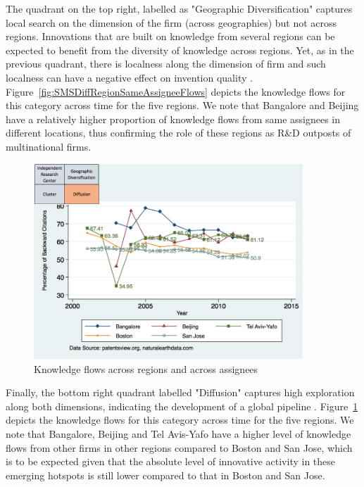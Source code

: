 \documentclass[parskip=full,12pt,letterpaper]{article}
\begin{document}
The quadrant on the top right, labelled as "Geographic Diversification" captures local search on the dimension of the firm (across geographies) but not across regions. Innovations that are built on knowledge from several regions can be expected to benefit from the diversity of knowledge across regions. Yet, as in the previous quadrant, there is localness along the dimension of firm and such localness can have a negative effect on invention quality \citep{Rosenkopf2001}. Figure~\ref{fig:SMSDiffRegionSameAssigneeFlows} depicts the  knowledge flows for this category across time for the five regions. We note that Bangalore and Beijing have a relatively higher proportion of knowledge flows from same assignees in different locations, thus confirming the role of these regions as R\&D outposts of multinational firms.\par

\begin{figure}[h!]
\begin{centering}
  \includegraphics[width=0.90\textwidth]{SMSDiffRegionDiffAssigneeFlows}
  \caption{Knowledge flows across regions and across assignees}
  \label{fig:SMSDiffRegionDiffAssigneeFlows}
\end{centering}
\end{figure}

Finally, the bottom right quadrant labelled "Diffusion" captures high exploration along both dimensions, indicating the development of a global pipeline \citep*{Bathelt2004}. Figure~\ref{fig:SMSDiffRegionDiffAssigneeFlows} depicts the  knowledge flows for this category across time for the five regions. We note that Bangalore, Beijing and Tel Avis-Yafo have a higher level of knowledge flows from other firms in other regions compared to Boston and San Jose, which is to be expected given that the absolute level of innovative activity in these emerging hotspots is still lower compared to that in Boston and San Jose. \par
\end{document}

